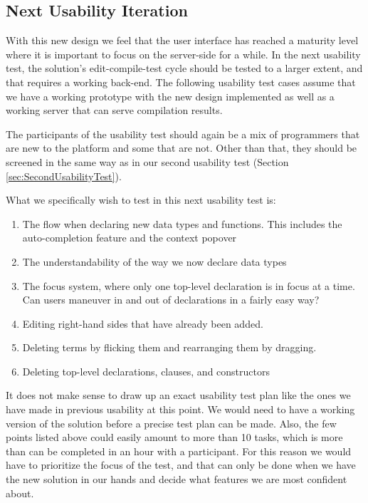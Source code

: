 \subsection{Next Usability Iteration}
With this new design we feel that the user interface has reached a maturity
level where it is important to focus on the server-side for a while. In the
next usability test, the solution's edit-compile-test cycle should be tested to
a larger extent, and that requires a working back-end. The following usability
test cases assume that we have a working prototype with the new design
implemented as well as a working server that can serve compilation results.

The participants of the usability test should again be a mix of programmers
that are new to the platform and some that are not. Other than that, they
should be screened in the same way as in our second usability test (Section
\ref{sec:SecondUsabilityTest}).

What we specifically wish to test in this next usability test is:

\begin{enumerate}
	\item The flow when declaring new data types and functions. This includes the auto-completion feature and the context popover
	\item The understandability of the way we now declare data types
	\item The focus system, where only one top-level declaration is in focus at a
	time. Can users maneuver in and out of declarations in a fairly easy way?
	\item Editing right-hand sides that have already been added.
	\item Deleting terms by flicking them and rearranging them by dragging.
	\item Deleting top-level declarations, clauses, and constructors
\end{enumerate}

It does not make sense to draw up an exact usability test plan like the ones we have made in previous usability
at this point. We would need to have a working version of the solution before a precise test plan can be made. Also, the few points listed above could easily amount to more than 10 tasks, which is more than can be completed in an hour with a participant. For this reason we would have to prioritize the focus of the test, and that can only be done when we have the new solution in our hands and decide what features we are most confident about. 




